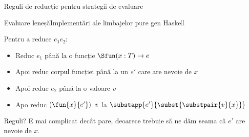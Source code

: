 \documentclass[xcolor=pdftex,romanian,colorlinks]{beamer}
\begin{document}
\begin{subsection}{Reguli de reducție pentru strategii de evaluare}
\begin{frame}{Evaluare leneșă}{Implementări ale limbajelor pure gen Haskell}
\begin{block}{}
Pentru a reduce $e_1 \mathrel{} e_2$:
\begin{itemize}
\item  Reduc $e_1$ până la o funcție
$\Sfun (x : T) \rightarrow e$
\item Apoi reduc corpul funcției  până la un $e'$ care are nevoie de $x$
\item Apoi reduc $e_2$ până la o valoare $v$
\item Apo reduc $(\fun{x}{e'})\mathrel{} v$ la $\substapp{e'}{\subst{\substpair{v}{x}}}$
\end{itemize}
\end{block}
\begin{block}{Reguli?}
E mai complicat decât pare, deoarece trebuie să ne dăm seama că $e'$ are nevoie de $x$.
\end{block}

\end{frame}

\end{subsection}
%
%
\end{document}
